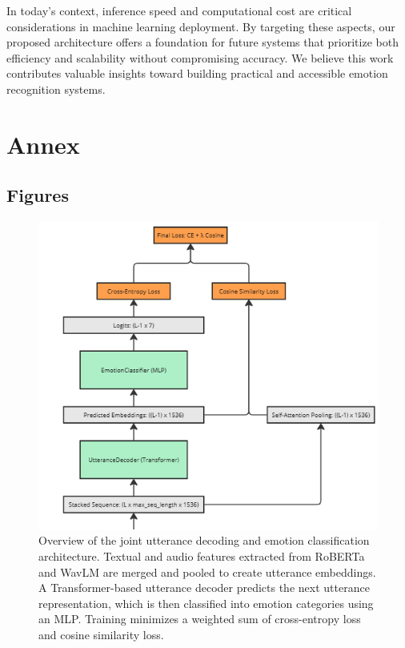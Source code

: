 \documentclass{article}
\begin{document}
In today’s context, inference speed and computational cost are critical considerations in machine learning deployment. By targeting these aspects, our proposed architecture offers a foundation for future systems that prioritize both efficiency and scalability without compromising accuracy. We believe this work contributes valuable insights toward building practical and accessible emotion recognition systems.


\clearpage
\section{Annex}

\subsection{Figures}

\begin{figure}[hbtp]
    \centering
    \includegraphics[width=0.8\linewidth]{Images/transformer_decoder.png}
    \caption{Overview of the joint utterance decoding and emotion classification architecture. Textual and audio features extracted from RoBERTa and WavLM are merged and pooled to create utterance embeddings. A Transformer-based utterance decoder predicts the next utterance representation, which is then classified into emotion categories using an MLP. Training minimizes a weighted sum of cross-entropy loss and cosine similarity loss.}
    \label{fig:transf-dec}
\end{figure}
\end{document}
